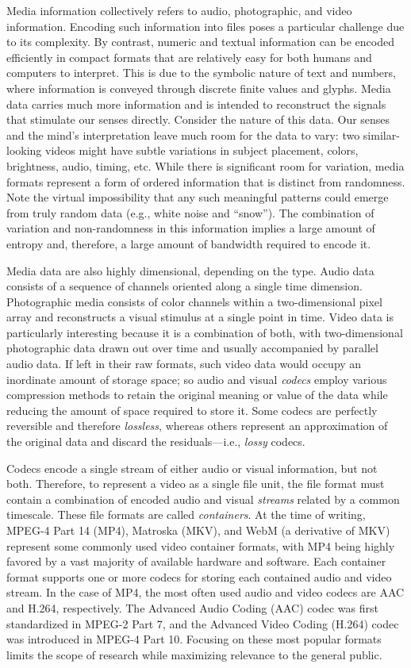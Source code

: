 Media information collectively refers to audio, photographic, and video information. Encoding such information into files poses a particular challenge due to its complexity. By contrast, numeric and textual information can be encoded efficiently in compact formats that are relatively easy for both humans and computers to interpret. This is due to the symbolic nature of text and numbers, where information is conveyed through discrete finite values and glyphs. Media data carries much more information and is intended to reconstruct the signals that stimulate our senses directly. Consider the nature of this data. Our senses and the mind's interpretation leave much room for the data to vary: two similar-looking videos might have subtle variations in subject placement, colors, brightness, audio, timing, etc. While there is significant room for variation, media formats represent a form of ordered information that is distinct from randomness. Note the virtual impossibility that any such meaningful patterns could emerge from truly random data (e.g., white noise and ``snow''). The combination of variation and non-randomness in this information implies a large amount of entropy and, therefore, a large amount of bandwidth required to encode it.

Media data are also highly dimensional, depending on the type. Audio data consists of a sequence of channels oriented along a single time dimension. Photographic media consists of color channels within a two-dimensional pixel array and reconstructs a visual stimulus at a single point in time. Video data is particularly interesting because it is a combination of both, with two-dimensional photographic data drawn out over time and usually accompanied by parallel audio data. If left in their raw formats, such video data would occupy an inordinate amount of storage space; so audio and visual \emph{codecs} employ various compression methods to retain the original meaning or value of the data while reducing the amount of space required to store it. Some codecs are perfectly reversible and therefore \emph{lossless}, whereas others represent an approximation of the original data and discard the residuals---i.e., \emph{lossy} codecs.

Codecs encode a single stream of either audio or visual information, but not both. Therefore, to represent a video as a single file unit, the file format must contain a combination of encoded audio and visual \emph{streams} related by a common timescale. These file formats are called \emph{containers}. At the time of writing, MPEG-4 Part 14 (MP4), Matroska (MKV), and WebM (a derivative of MKV) represent some commonly used video container formats, with MP4 being highly favored by a vast majority of available hardware and software. Each container format supports one or more codecs for storing each contained audio and video stream. In the case of MP4, the most often used audio and video codecs are AAC and H.264, respectively. The Advanced Audio Coding (AAC) codec was first standardized in MPEG-2 Part 7, and the Advanced Video Coding (H.264) codec was introduced in MPEG-4 Part 10. Focusing on these most popular formats limits the scope of research while maximizing relevance to the general public.


